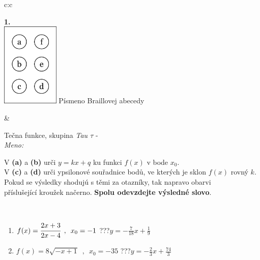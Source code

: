 \documentclass[10pt]{report}
\begin{document}
\begin{tabular}{c:c}
\begin{minipage}[c][104.5mm][t]{0.5\linewidth}
\begin{center}
\begin{minipage}{0.20\linewidth}
\begin{center}
{\Huge\bfseries 1.} \\[2mm]
\includegraphics[height=40mm]{../images/braille.png}
{\small Písmeno Braillovej abecedy}
\end{center}
\end{minipage}
\end{center}
\end{minipage}
&
\begin{minipage}[c][104.5mm][t]{0.5\linewidth}
\begin{center}
\vspace{7mm}
{\huge Tečna funkce, skupina \textit{Tau $\tau$} -}\\[5mm]
\textit{Meno:}\phantom{xxxxxxxxxxxxxxxxxxxxxxxxxxxxxxxxxxxxxxxxxxxxxxxxxxxxxxxxxxxxxxxxx}\\[5mm]
\begin{minipage}{0.95\linewidth}
\begin{center}
V \textbf{(a)} a \textbf{(b)} urči  $y = kx + q$ ku funkci $f(x)$ v bode $x_0$.\\V \textbf{(c)} a \textbf{(d)} urči ypsilonové souřadnice bodů, ve kterých je sklon $f(x)$ rovný $k$.\\Pokud se výsledky shodujú s těmi za otazníky, tak napravo obarvi\\příslušející kroužek načerno. \textbf{Spolu odevzdejte výsledné slovo}.
\end{center}
\end{minipage}
\\[1mm]
\begin{minipage}{0.79\linewidth}
\begin{center}
\begin{varwidth}{\linewidth}
\begin{enumerate}
\small
\item $f(x)=\cfrac{2x+3}{2x-4}\enspace , \enspace x_0=-1$\quad \dotfill\; ???\;\dotfill \quad $y = -\frac{7}{18}x+\frac{1}{9}$
\item $f(x)=8\sqrt{-x+1}\enspace , \enspace x_0=-35$\quad \dotfill\; ???\;\dotfill \quad $y = -\frac{2}{3}x+\frac{74}{3}$

\end{enumerate}
\end{varwidth}
\end{center}
\end{minipage}
\end{center}
\end{minipage}
\end{tabular}
\end{document}
